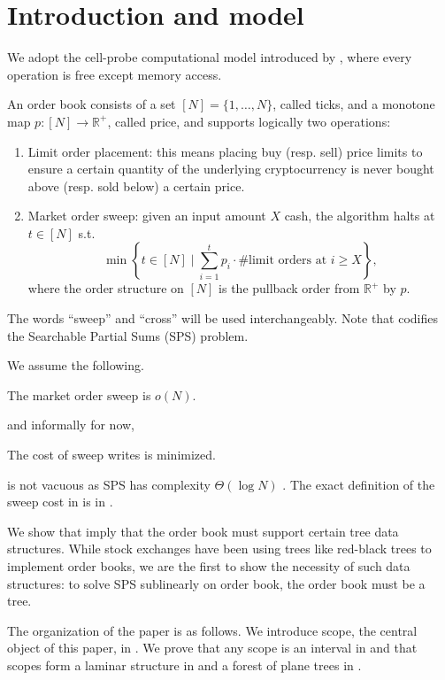 \section{Introduction and model}
We adopt the cell-probe computational model introduced by \textcite{yao}, where every operation is free except memory access.

An order book consists of a set $[N]=\{1,\dots,N\}$, called ticks, and a monotone map $p:[N]\to\mathbb{R}^+$, called price, and supports logically two operations:
\begin{enumerate}
    \item Limit order placement: this means placing buy (resp. sell) price limits to ensure a certain quantity of the underlying cryptocurrency is never bought above (resp. sold below) a certain price.  
    \item Market order sweep: given an input amount $X$ cash, the algorithm halts at $t\in[N]$ s.t.
    \begin{equation} \label{eqn:searchable-partial-sum}
        \min\left\{t\in[N]\mid\sum_{i=1}^tp_i\cdot \text{\#limit orders at }i\geq X\right\},
    \end{equation}
    where the order structure on $[N]$ is the pullback order from $\mathbb{R}^+$ by $p$.
\end{enumerate}
The words ``sweep'' and ``cross'' will be used interchangeably. Note that  codifies the Searchable Partial Sums (SPS) problem.

We assume the following.
\begin{axiom} \label{axiom:sub}
    The market order sweep is $o(N)$.
\end{axiom}
and informally for now,
\begin{axiom} \label{axiom:min}
    The cost of sweep writes is minimized.
\end{axiom}
 is not vacuous as SPS has complexity $\Theta(\log N)$ \parencite{patrascu}. The exact definition of the sweep cost in  is in .

We show that  imply that the order book must support certain tree data structures. While stock exchanges have been using trees like red-black trees to implement order books, we are the first to show the necessity of such data structures: to solve SPS sublinearly on order book, the order book must be a tree.

The organization of the paper is as follows. We introduce scope, the central object of this paper, in . We prove that any scope is an interval in  and that scopes form a laminar structure in  and a forest of plane trees in .

